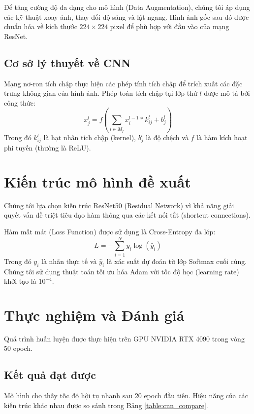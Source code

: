 \documentclass[11pt,a4paper]{article}
\begin{document}
Để tăng cường độ đa dạng cho mô hình (Data Augmentation), chúng tôi áp dụng các kỹ thuật xoay ảnh, thay đổi độ sáng và lật ngang. Hình ảnh gốc sau đó được chuẩn hóa về kích thước $224 \times 224$ pixel để phù hợp với đầu vào của mạng ResNet.

\subsection{Cơ sở lý thuyết về CNN}
Mạng nơ-ron tích chập thực hiện các phép tính tích chập để trích xuất các đặc trưng không gian của hình ảnh. Phép toán tích chập tại lớp thứ $l$ được mô tả bởi công thức:
\begin{equation}
    x_j^l = f \left( \sum_{i \in M_j} x_i^{l-1} * k_{ij}^l + b_j^l \right)
\end{equation}
Trong đó $k_{ij}^l$ là hạt nhân tích chập (kernel), $b_j^l$ là độ chệch và $f$ là hàm kích hoạt phi tuyến (thường là ReLU).

\section{Kiến trúc mô hình đề xuất}
Chúng tôi lựa chọn kiến trúc ResNet50 (Residual Network) vì khả năng giải quyết vấn đề triệt tiêu đạo hàm thông qua các kết nối tắt (shortcut connections).

Hàm mất mát (Loss Function) được sử dụng là Cross-Entropy đa lớp:
\begin{equation}
    L = -\sum_{i=1}^{N} y_i \log(\hat{y}_i)
\end{equation}
Trong đó $y_i$ là nhãn thực tế và $\hat{y}_i$ là xác suất dự đoán từ lớp Softmax cuối cùng. Chúng tôi sử dụng thuật toán tối ưu hóa Adam với tốc độ học (learning rate) khởi tạo là $10^{-4}$.

\section{Thực nghiệm và Đánh giá}
Quá trình huấn luyện được thực hiện trên GPU NVIDIA RTX 4090 trong vòng 50 epoch.

\subsection{Kết quả đạt được}
Mô hình cho thấy tốc độ hội tụ nhanh sau 20 epoch đầu tiên. Hiệu năng của các kiến trúc khác nhau được so sánh trong Bảng \ref{table:cnn_compare}.
\end{document}
